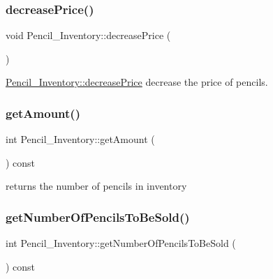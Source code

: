 \subsubsection{\texorpdfstring{decrease\+Price()}{decreasePrice()}}
{\footnotesize\ttfamily void Pencil\+\_\+\+Inventory\+::decrease\+Price (\begin{DoxyParamCaption}{ }\end{DoxyParamCaption})}



\hyperlink{classPencil__Inventory_a711d64e733cd5b67ea3aeb0ccdda0870}{Pencil\+\_\+\+Inventory\+::decrease\+Price} decrease the price of pencils. 

\mbox{\label{classPencil__Inventory_a493a0967a8369d5b8c3e3709eeb21b5e}} 
\subsubsection{\texorpdfstring{get\+Amount()}{getAmount()}}
{\footnotesize\ttfamily int Pencil\+\_\+\+Inventory\+::get\+Amount (\begin{DoxyParamCaption}{ }\end{DoxyParamCaption}) const}



returns the number of pencils in inventory 

\mbox{\label{classPencil__Inventory_a3cd52fbcbd4e3bedbcbe2031cb9a3286}} 
\subsubsection{\texorpdfstring{get\+Number\+Of\+Pencils\+To\+Be\+Sold()}{getNumberOfPencilsToBeSold()}}
{\footnotesize\ttfamily int Pencil\+\_\+\+Inventory\+::get\+Number\+Of\+Pencils\+To\+Be\+Sold (\begin{DoxyParamCaption}{ }\end{DoxyParamCaption}) const}

\mbox{\label{classPencil__Inventory_a0ce9e6370396e24ae4d11b27b84c7160}} 
